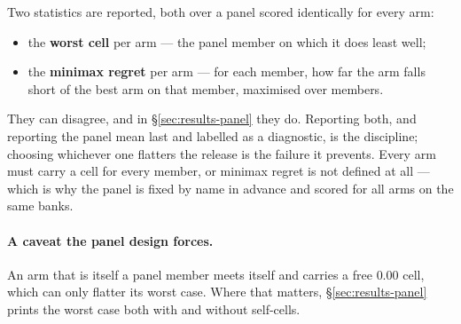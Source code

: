 Two statistics are reported, both over a panel scored identically for every arm:

\begin{itemize}
\item the \textbf{worst cell} per arm --- the panel member on which it does least well;
\item the \textbf{minimax regret} per arm --- for each member, how far the arm falls short of the
      best arm on that member, maximised over members.
\end{itemize}

They can disagree, and in \S\ref{sec:results-panel} they do. Reporting both, and reporting the panel
mean last and labelled as a diagnostic, is the discipline; choosing whichever one flatters the
release is the failure it prevents. Every arm must carry a cell for every member, or minimax regret
is not defined at all --- which is why the panel is fixed by name in advance and scored for all arms
on the same banks.

\paragraph{A caveat the panel design forces.} An arm that is itself a panel member meets itself and
carries a free $0.00$ cell, which can only flatter its worst case. Where that matters,
\S\ref{sec:results-panel} prints the worst case both with and without self-cells.
